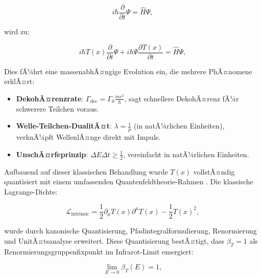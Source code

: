 ﻿\documentclass[twocolumn,aps,prl]{revtex4-2}
\begin{document}
{{{{{{{{{{{{{{																\begin{equation}
																	i \hbar \frac{\partial}{\partial t} \Psi = \hat{H} \Psi, \label{eq:std_schrodinger}
																\end{equation}
																
																wird zu:
																
																\begin{equation}
																	i \hbar T(x) \frac{\partial}{\partial t} \Psi + i \hbar \Psi \frac{\partial T(x)}{\partial t} = \hat{H} \Psi, \label{eq:mod_schrodinger}
																\end{equation}
																
																Dies fÃ¼hrt eine massenabhÃ¤ngige Evolution ein, die mehrere PhÃ¤nomene erklÃ¤rt:
																
																\begin{itemize}
																	\item \textbf{DekohÃ¤renzrate}: \(\Gamma_{\text{dec}} = \Gamma_0 \frac{m c^2}{\hbar}\), sagt schnellere DekohÃ¤renz fÃ¼r schwerere Teilchen voraus.
																	\item \textbf{Welle-Teilchen-DualitÃ¤t}: \(\lambda = \frac{1}{p}\) (in natÃ¼rlichen Einheiten), verknÃ¼pft WellenlÃ¤nge direkt mit Impuls.
																	\item \textbf{UnschÃ¤rfeprinzip}: \(\Delta E \Delta t \geq \frac{1}{2}\), vereinfacht in natÃ¼rlichen Einheiten.
																\end{itemize}
																
																Aufbauend auf dieser klassischen Behandlung wurde \(T(x)\) vollstÃ¤ndig quantisiert mit einem umfassenden Quantenfeldtheorie-Rahmen \cite{pascher_qft_2025}. Die klassische Lagrange-Dichte:
																
																\begin{equation}
																	\mathcal{L}_{\text{intrinsic}} = \frac{1}{2} \partial_{\mu} T(x) \partial^{\mu} T(x) - \frac{1}{2} T(x)^2, \label{eq:lagrangian_T}
																\end{equation}
																
																wurde durch kanonische Quantisierung, Pfadintegralformulierung, Renormierung und UnitÃ¤tsanalyse erweitert. Diese Quantisierung bestÃ¤tigt, dass \(\beta_T = 1\) als Renormierungsgruppenfixpunkt im Infrarot-Limit emergiert:
																
																\begin{equation}
																	\lim_{E \to 0} \beta_T(E) = 1, \label{eq:beta_fixed_point}
																\end{equation}
																
}}}}}}}}}}}}}}
\end{document}
